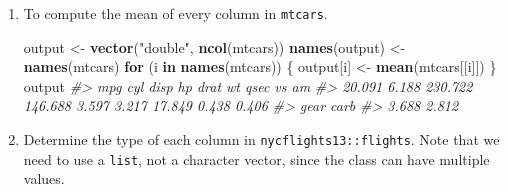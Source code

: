 \documentclass[]{book}
\newenvironment{Shaded}{\begin{snugshade}}{\end{snugshade}}
\newcommand{\CommentTok}[1]{\textcolor[rgb]{0.56,0.35,0.01}{\textit{#1}}}
\newcommand{\ControlFlowTok}[1]{\textcolor[rgb]{0.13,0.29,0.53}{\textbf{#1}}}
\newcommand{\KeywordTok}[1]{\textcolor[rgb]{0.13,0.29,0.53}{\textbf{#1}}}
\newcommand{\NormalTok}[1]{#1}
\newcommand{\StringTok}[1]{\textcolor[rgb]{0.31,0.60,0.02}{#1}}
\theoremstyle{plain}
\theoremstyle{remark}
\begin{document}
\begin{enumerate}
\def\labelenumi{\arabic{enumi}.}
\item
  To compute the mean of every column in \texttt{mtcars}.

\begin{Shaded}
\begin{Highlighting}[]
\NormalTok{output <-}\StringTok{ }\KeywordTok{vector}\NormalTok{(}\StringTok{"double"}\NormalTok{, }\KeywordTok{ncol}\NormalTok{(mtcars))}
\KeywordTok{names}\NormalTok{(output) <-}\StringTok{ }\KeywordTok{names}\NormalTok{(mtcars)}
\ControlFlowTok{for}\NormalTok{ (i }\ControlFlowTok{in} \KeywordTok{names}\NormalTok{(mtcars)) \{}
\NormalTok{  output[i] <-}\StringTok{ }\KeywordTok{mean}\NormalTok{(mtcars[[i]])}
\NormalTok{\}}
\NormalTok{output}
\CommentTok{#>     mpg     cyl    disp      hp    drat      wt    qsec      vs      am }
\CommentTok{#>  20.091   6.188 230.722 146.688   3.597   3.217  17.849   0.438   0.406 }
\CommentTok{#>    gear    carb }
\CommentTok{#>   3.688   2.812}
\end{Highlighting}
\end{Shaded}
\item
  Determine the type of each column in \texttt{nycflights13::flights}.
  Note that we need to use a \texttt{list}, not a character vector,
  since the class can have multiple values.


\end{enumerate}
\end{document}

